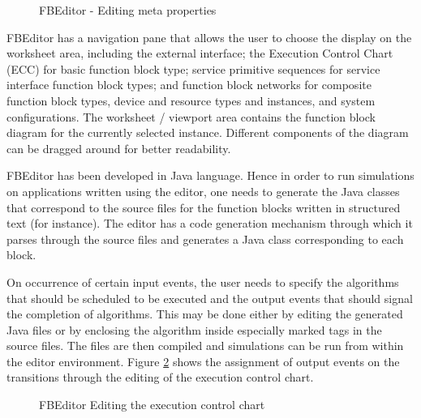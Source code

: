 %
\begin{figure}
\begin{center}
\caption[FBEditor - Editing meta properties]{FBEditor - Editing
meta properties{\protect ~\cite{c:fun:2002}}}
\label{f:Editor-Versions}
\end{center}
\end{figure}
%
FBEditor has a navigation pane that allows the user to choose the
display on the worksheet area, including the external interface;
the Execution Control Chart (ECC) for basic function block type;
service primitive sequences for service interface function block
types; and function block networks for composite function block
types, device and resource types and instances, and system
configurations. The worksheet / viewport area contains the
function block diagram for the currently selected instance.
Different components of the diagram can be dragged around for
better readability.


FBEditor has been developed in Java language. Hence in order to
run simulations on applications written using the editor, one
needs to generate the Java classes that correspond to the source
files for the function blocks written in structured text (for
instance). The editor has a code generation mechanism through
which it parses through the source files and generates a Java
class corresponding to each block.


On occurrence of certain input events, the user needs to specify
the algorithms that should be scheduled to be executed and the
output events that should signal the completion of algorithms.
This may be done either by editing the generated Java files or by
enclosing the algorithm inside especially marked tags in the
source files. The files are then compiled and simulations can be
run from within the editor environment. Figure
\ref{f:Editor-Transitions} shows the assignment of output events
on the transitions through the editing of the execution control
chart.

%
\begin{figure}
\begin{center}
\caption[FBEditor Editing the execution control chart]{FBEditor
Editing the execution control chart{\protect ~\cite{c:fun:2002}}}
\label{f:Editor-Transitions}
\end{center}
\end{figure}
%

